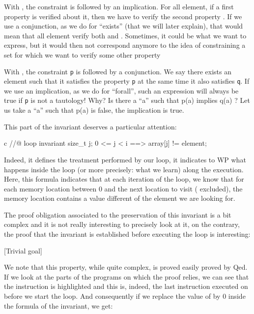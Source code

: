 \documentclass[middle]{zmdocument}
\begin{document}
With ,
the constraint  is followed by an implication. For all
element, if a first property  is verified about it, then we
have to verify the second property . If we use a conjunction,
as we do for ``exists'' (that we will later explain), that would mean
that all element verify both  and . Sometimes, it
could be what we want to express, but it would then not correspond
anymore to the idea of constraining a set for which we want to verify
some other property



With , the
constraint \texttt{p} is followed by a conjunction. We say there exists
an element such that it satisfies the property \texttt{p} at the same
time it also satisfies \texttt{q}. If we use an implication, as we do
for ``forall'', such an expression will always be true if \texttt{p} is
not a tautology! Why? Is there a ``a'' such that p(a) implies q(a) ? Let
us take a ``a'' such that p(a) is false, the implication is true.



This part of the invariant deserves a particular attention:



\begin{CodeBlock}{c}
//@ loop invariant \forall size_t j; 0 <= j < i ==> array[j] != element;
\end{CodeBlock}



Indeed, it defines the treatment performed by our loop, it indicates to
WP what happens inside the loop (or more precisely: what we learn) along
the execution. Here, this formula indicates that at each iteration of
the loop, we know that for each memory location between 0 and the next
location to visit ( excluded), the memory location contains a
value different of the element we are looking for.

The proof obligation associated to the preservation of this invariant is
a bit complex and it is not really interesting to precisely look at it,
on the contrary, the proof that the invariant is established before
executing the loop is interesting:



[Trivial goal]


We note that this property, while quite complex, is proved easily proved
by Qed. If we look at the parts of the programs on which the proof
relies, we can see that the instruction  is highlighted
and this is, indeed, the last instruction executed on  before
we start the loop. And consequently if we replace the value of
 by 0 inside the formula of the invariant, we get:
\end{document}
